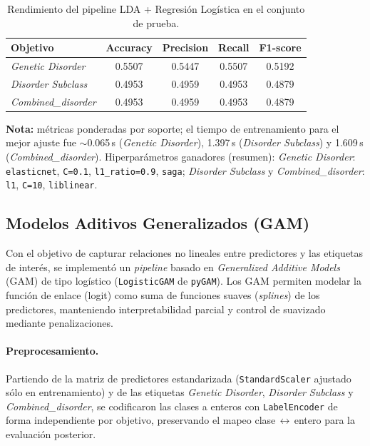 \documentclass[11pt,a4paper,spanish]{book}
\numberwithin{equation}{chapter}
\numberwithin{figure}{chapter}
\begin{document}
\begin{table}[H]
\centering
\caption{Rendimiento del pipeline LDA + Regresión Logística en el conjunto de prueba.}
\label{tab:lda-logit-resultados}
\begin{tabular}{lcccc}
\toprule
\textbf{Objetivo} & \textbf{Accuracy} & \textbf{Precision} & \textbf{Recall} & \textbf{F1-score} \\
\midrule
\textit{Genetic Disorder}      & 0.5507 & 0.5447 & 0.5507 & 0.5192 \\
\textit{Disorder Subclass}     & 0.4953 & 0.4959 & 0.4953 & 0.4879 \\
\textit{Combined\_disorder}    & 0.4953 & 0.4959 & 0.4953 & 0.4879 \\
\bottomrule
\end{tabular}

\vspace{0.5em}
\footnotesize
\textbf{Nota:} métricas ponderadas por soporte; el tiempo de entrenamiento para el mejor ajuste fue $\sim$0.065\,s (\textit{Genetic Disorder}), 1.397\,s (\textit{Disorder Subclass}) y 1.609\,s (\textit{Combined\_disorder}). Hiperparámetros ganadores (resumen): 
\textit{Genetic Disorder}: \texttt{elasticnet}, \texttt{C=0.1}, \texttt{l1\_ratio=0.9}, \texttt{saga}; 
\textit{Disorder Subclass} y \textit{Combined\_disorder}: \texttt{l1}, \texttt{C=10}, \texttt{liblinear}.
\end{table}

\subsection{Modelos Aditivos Generalizados (GAM)}
\label{subsec:gam}

Con el objetivo de capturar relaciones no lineales entre predictores y las etiquetas de interés,
se implementó un \textit{pipeline} basado en \textit{Generalized Additive Models} (GAM) de tipo
logístico (\texttt{LogisticGAM} de \texttt{pyGAM}).
Los GAM permiten modelar la función de enlace (logit) como suma de funciones suaves
(\textit{splines}) de los predictores, manteniendo interpretabilidad parcial y control de suavizado
mediante penalizaciones.

\paragraph{Preprocesamiento.}
Partiendo de la matriz de predictores estandarizada (\texttt{StandardScaler} ajustado sólo en entrenamiento)
y de las etiquetas \textit{Genetic Disorder}, \textit{Disorder Subclass} y \textit{Combined\_disorder},
se codificaron las clases a enteros con \texttt{LabelEncoder} de forma independiente por objetivo,
preservando el mapeo clase\,$\leftrightarrow$\,entero para la evaluación posterior.
\end{document}
